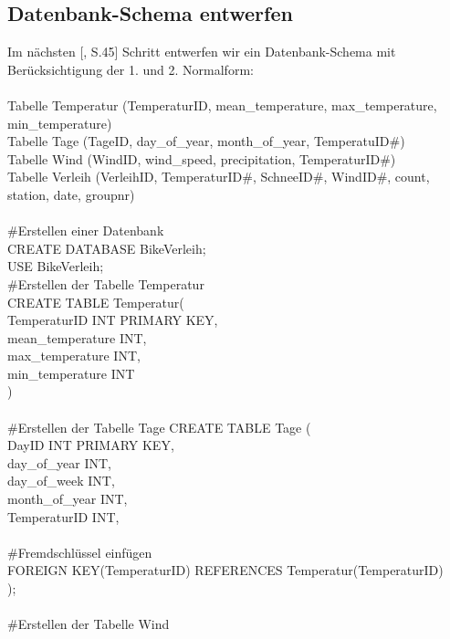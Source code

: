 \documentclass[1pt]{article}
\begin{document}
\newpage
\subsection{Datenbank-Schema entwerfen}
Im nächsten [\cite{SQLite}, S.45] Schritt entwerfen wir ein Datenbank-Schema mit Berücksichtigung der 1. und 2. 
Normalform:\\
\\
Tabelle Temperatur (TemperaturID, mean\_temperature, max\_temperature, min\_temperature)\\
Tabelle Tage (TageID, day\_of\_year, month\_of\_year, TemperatuID#)\\
Tabelle Wind (WindID, wind\_speed, precipitation, TemperaturID#)\\
Tabelle Verleih (VerleihID, TemperaturID#, SchneeID#, WindID#, count, station, date, groupnr)\\

\\ #Erstellen einer Datenbank\\
CREATE DATABASE BikeVerleih;\\
USE BikeVerleih;\\

 #Erstellen der Tabelle Temperatur\\
CREATE TABLE Temperatur(\\ 
TemperaturID INT PRIMARY KEY,\\
mean\_temperature INT,\\
max\_temperature INT,\\
min\_temperature INT\\
)\\
\\
#Erstellen der Tabelle Tage 
CREATE TABLE Tage (\\
DayID INT PRIMARY KEY,\\
day\_of\_year INT,\\
day\_of\_week INT,\\
month\_of\_year  INT,\\
TemperaturID INT,\\
\\
#Fremdschlüssel einfügen\\
FOREIGN KEY(TemperaturID) REFERENCES Temperatur(TemperaturID)\\
);\\
\\
#Erstellen der Tabelle Wind\\
\end{document}
